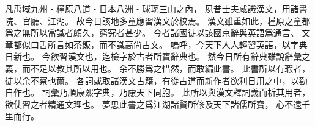 凡禹域九州・槿原八道・日本八洲・球璃三山之內，
夙昔士夫咸識漢文，用諸書院、官廳、江湖。
故今日該地多童應習漢文於校焉。
漢文雖重如此，槿原之童都爲之無所以當識者頗久，窮究者甚少。
今者諸國徒以該國京辭與英語爲通言、
文章都似口舌所言如茶飯，而不識高尙古文。
嗚呼，今天下人人輕習英語，以字典日新也。
今欲習漢文也，迄檢字於古者所寶辭典也。
然今日所有辭典雖說辭彙之義，而不足以教其所以用也。
余不勝爲之惜然，而敢編此書。
此書所以有瑕者，徒以余不察也爾。
各詞或取諸漢文古籍，有從古道而新作者欲利日用之中，以勸自作也。
詞彙乃順康熙字典，乃慮天下同胞。
此所以與漢文釋詞義而析其用者，欲使習之者精通文理也。
夢思此書之爲江湖諸賢所修及天下諸儒所寶，
心不遠千里而行。
